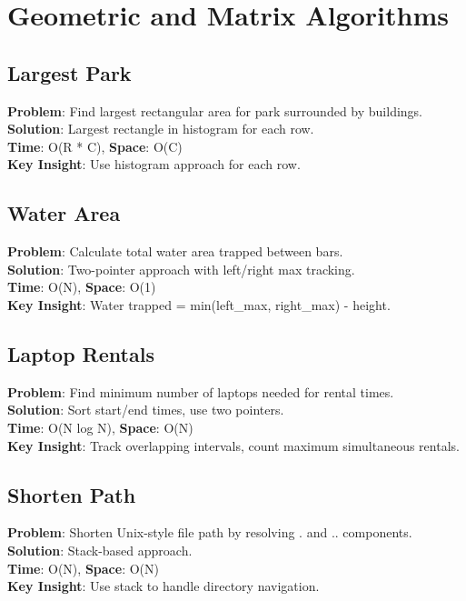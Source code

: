 \documentclass{report}
\begin{document}
\section{Geometric and Matrix Algorithms}

\subsection{Largest Park}
\textbf{Problem}: Find largest rectangular area for park surrounded by buildings.\\
\textbf{Solution}: Largest rectangle in histogram for each row.\\
\textbf{Time}: O(R * C), \textbf{Space}: O(C)\\
\textbf{Key Insight}: Use histogram approach for each row.

\subsection{Water Area}
\textbf{Problem}: Calculate total water area trapped between bars.\\
\textbf{Solution}: Two-pointer approach with left/right max tracking.\\
\textbf{Time}: O(N), \textbf{Space}: O(1)\\
\textbf{Key Insight}: Water trapped = min(left\_max, right\_max) - height.

\subsection{Laptop Rentals}
\textbf{Problem}: Find minimum number of laptops needed for rental times.\\
\textbf{Solution}: Sort start/end times, use two pointers.\\
\textbf{Time}: O(N log N), \textbf{Space}: O(N)\\
\textbf{Key Insight}: Track overlapping intervals, count maximum simultaneous rentals.

\subsection{Shorten Path}
\textbf{Problem}: Shorten Unix-style file path by resolving . and .. components.\\
\textbf{Solution}: Stack-based approach.\\
\textbf{Time}: O(N), \textbf{Space}: O(N)\\
\textbf{Key Insight}: Use stack to handle directory navigation.
\end{document}
